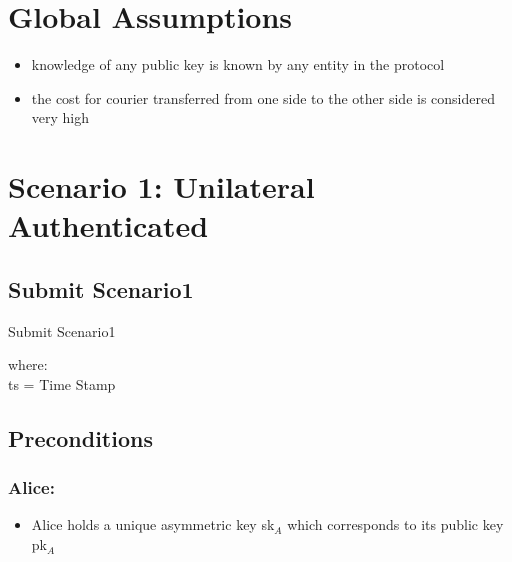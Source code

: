 \documentclass{article}
\begin{document}
\setlength{\marginparwidth}{20pt}

\section*{Global Assumptions}
\begin{itemize}
\item knowledge of any public key is known by any entity in the protocol
\item the cost for courier transferred from one side to the other side is considered very high
\end{itemize}
\vspace{20pt}

\section*{Scenario 1: Unilateral Authenticated}
\subsection*{Submit Scenario1}
\begin{msc}{Submit Scenario1}
\setlength{\instdist}{3\instdist}
\setlength{\envinstdist}{2\envinstdist}
\setlength{\levelheight}{1.5\levelheight}

\nextlevel[2]
\nextlevel
{}
\nextlevel
{}
\nextlevel
{}
\nextlevel[2]
\nextlevel
{}
\nextlevel[2]
\nextlevel
\end{msc}
where:\\
ts = Time Stamp

\subsection*{Preconditions}
\subsubsection*{Alice:}
\begin{itemize}
\item Alice holds a unique asymmetric key sk$_A$ which corresponds to its public key pk$_A$
\end{itemize}
\end{document}
